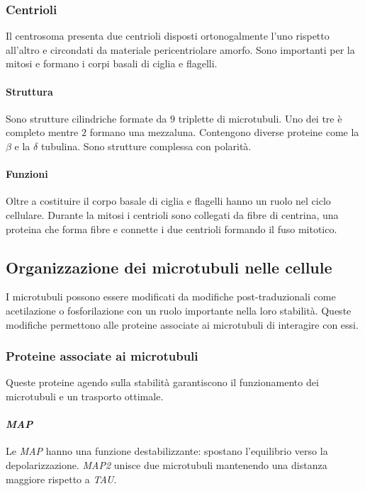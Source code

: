 		\subsubsection{Centrioli}
		Il centrosoma presenta due centrioli disposti ortonogalmente l'uno rispetto all'altro e circondati da materiale pericentriolare amorfo.
		Sono importanti per la mitosi e formano i corpi basali di ciglia e flagelli.
			
			\paragraph{Struttura}
			Sono strutture cilindriche formate da $9$ triplette di microtubuli.
			Uno dei tre \`e completo mentre $2$ formano una mezzaluna.
			Contengono diverse proteine come la $\beta$ e la $\delta$ tubulina.
			Sono strutture complessa con polarit\`a.

			\paragraph{Funzioni}
			Oltre a costituire il corpo basale di ciglia e flagelli hanno un ruolo nel ciclo cellulare.
			Durante la mitosi i centrioli sono collegati da fibre di centrina, una proteina che forma fibre e connette i due centrioli formando il fuso mitotico.

	\subsection{Organizzazione dei microtubuli nelle cellule}
	I microtubuli possono essere modificati da modifiche post-traduzionali come acetilazione o fosforilazione con un ruolo importante nella loro stabilit\`a.
	Queste modifiche permettono alle proteine associate ai microtubuli di interagire con essi.
	
		\subsubsection{Proteine associate ai microtubuli}
		Queste proteine agendo sulla stabilit\`a garantiscono il funzionamento dei microtubuli e un trasporto ottimale.

			\paragraph{\emph{MAP}}
			Le \emph{MAP} hanno una funzione destabilizzante: spostano l'equilibrio verso la depolarizzazione.
			\emph{MAP2} unisce due microtubuli mantenendo una distanza maggiore rispetto a \emph{TAU}.

